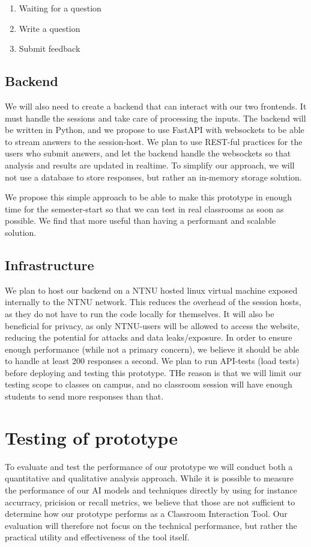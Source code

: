 \begin{enumerate}
    \item Waiting for a question
    \item Write a question
    \item Submit feedback
\end{enumerate}


\subsection{Backend}
We will also need to create a backend that can interact with our two frontends. It must handle the sessions and take care of processing the inputs. The backend will be written in Python, and we propose to use FastAPI with websockets to be able to stream answers to the session-host. We plan to use REST-ful practices for the users who submit answers, and let the backend handle the websockets so that analysis and results are updated in realtime. To simplify our approach, we will not use a database to store responses, but rather an in-memory storage solution.

We propose this simple approach to be able to make this prototype in enough time for the semester-start so that we can test in real classrooms as soon as possible. We find that more useful than having a performant and scalable solution. 


\subsection{Infrastructure}
We plan to host our backend on a NTNU hosted linux virtual machine exposed internally to the NTNU network. This reduces the overhead of the session hosts, as they do not have to run the code locally for themselves. It will also be beneficial for privacy, as only NTNU-users will be allowed to access the website, reducing the potential for attacks and data leaks/exposure. In order to ensure enough performance (while not a primary concern), we believe it should be able to handle at least 200 responses a second. We plan to run API-tests (load tests) before deploying and testing this prototype. THe reason is that we will limit our testing scope to classes on campus, and no classroom session will have enough students to send more responses than that.


\section{Testing of prototype}
To evaluate and test the performance of our prototype we will conduct both a quantitative and qualitative analysis approach. While it is possible to measure the performance of our AI models and techniques directly by using for instance accurracy, pricision or recall metrics, we believe that those are not sufficient to determine how our prototype performs as a Classroom Interaction Tool. Our evaluation will therefore not focus on the technical performance, but rather the practical utility and effectiveness of the tool itself. 

